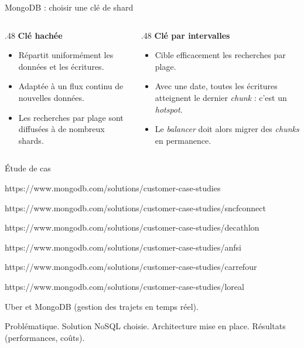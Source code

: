 \begin{frame}{MongoDB : choisir une clé de shard}
    \begin{columns}[T,onlytextwidth]
        \begin{column}{.48\textwidth}
            \textbf{Clé hachée}
            \begin{itemize}
                \item Répartit uniformément les données et les écritures.
                \item Adaptée à un flux continu de nouvelles données.
                \item Les recherches par plage sont diffusées à de nombreux
                      shards.
            \end{itemize}
        \end{column}
        \begin{column}{.48\textwidth}
            \textbf{Clé par intervalles}
            \begin{itemize}
                \item Cible efficacement les recherches par plage.
                \item Avec une date, toutes les écritures atteignent le dernier
                      \textit{chunk} : c'est un \textit{hotspot}.
                \item Le \textit{balancer} doit alors migrer des \textit{chunks}
                      en permanence.
            \end{itemize}
        \end{column}
    \end{columns}
\end{frame}

\begin{frame}{Étude de cas}

    https://www.mongodb.com/solutions/customer-case-studies

    https://www.mongodb.com/solutions/customer-case-studies/sncfconnect

    https://www.mongodb.com/solutions/customer-case-studies/decathlon

    https://www.mongodb.com/solutions/customer-case-studies/anfsi

    https://www.mongodb.com/solutions/customer-case-studies/carrefour

    https://www.mongodb.com/solutions/customer-case-studies/loreal

    Uber et MongoDB (gestion des trajets en temps réel).

    Problématique. Solution NoSQL choisie. Architecture mise en place. Résultats
    (performances, coûts).


\end{frame}
